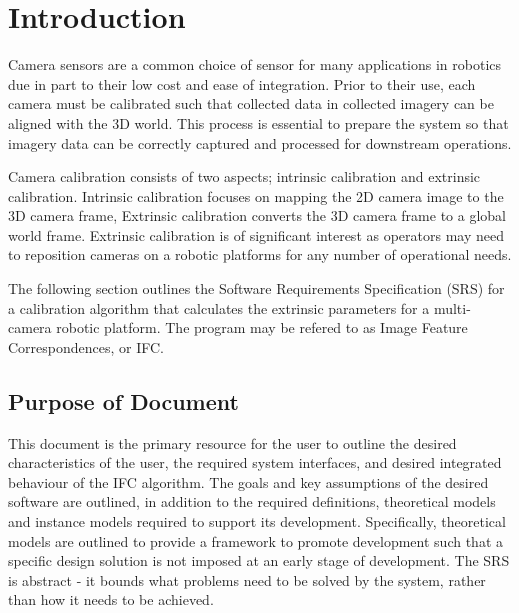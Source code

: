 \documentclass[12pt]{article}
\begin{document}
\section{Introduction}
Camera sensors are a common choice of sensor for many applications in robotics due 
in part to their low cost and ease of integration. Prior to their use, each camera 
must be calibrated such that collected data in collected imagery can be aligned with 
the 3D world. This process is essential to prepare the system so that 
imagery data can be correctly captured and processed for downstream operations.

Camera calibration consists of two aspects; intrinsic calibration and extrinsic 
calibration. Intrinsic calibration focuses on mapping the 2D camera image 
to the 3D camera frame, Extrinsic calibration converts the 3D camera frame
to a global world frame. Extrinsic calibration is of significant interest as  
operators may need to reposition cameras on a robotic platforms for any number of 
operational needs.

The following section outlines the Software Requirements Specification (SRS) for 
a calibration algorithm that calculates the extrinsic parameters for a multi-camera 
robotic platform. The program may be refered to as Image Feature Correspondences, 
or IFC.


\subsection{Purpose of Document}

This document is the primary resource for the user to outline the desired 
characteristics of the user, the required system interfaces, and desired 
integrated behaviour of the IFC algorithm. The goals and key assumptions of the
desired software are outlined, in addition to the required definitions, 
theoretical models and instance models required to support its development. 
Specifically, theoretical models are outlined to provide a framework to promote 
development such that a specific design solution is not imposed at an early stage 
of development. The SRS is abstract - it bounds what problems need to be solved by 
the system, rather than how it needs to be achieved.
\end{document}
